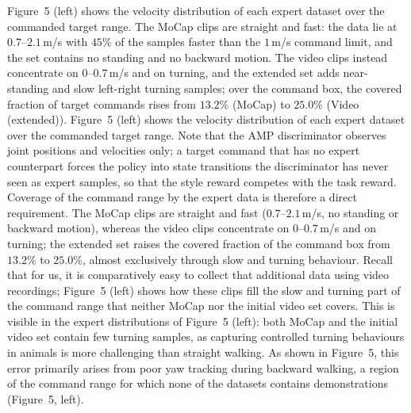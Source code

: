 Figure~5 (left) shows the velocity distribution of each expert dataset over the commanded target range. The MoCap clips are straight and fast: the data lie at $0.7$--$2.1\,$m/s with $45\%$ of the samples faster than the $1\,$m/s command limit, and the set contains no standing and no backward motion. The video clips instead concentrate on $0$--$0.7\,$m/s and on turning, and the extended set adds near-standing and slow left-right turning samples; over the command box, the covered fraction of target commands rises from $13.2\%$ (MoCap) to $25.0\%$ (Video (extended)).
Figure~5 (left) shows the velocity distribution of each expert dataset over the commanded target range. Note that the AMP discriminator observes joint positions and velocities only; a target command that has no expert counterpart forces the policy into state transitions the discriminator has never seen as expert samples, so that the style reward competes with the task reward. Coverage of the command range by the expert data is therefore a direct requirement. The MoCap clips are straight and fast ($0.7$--$2.1\,$m/s, no standing or backward motion), whereas the video clips concentrate on $0$--$0.7\,$m/s and on turning; the extended set raises the covered fraction of the command box from $13.2\%$ to $25.0\%$, almost exclusively through slow and turning behaviour.
Recall that for us, it is comparatively easy to collect that additional data using video recordings; Figure~5 (left) shows how these clips fill the slow and turning part of the command range that neither MoCap nor the initial video set covers.
This is visible in the expert distributions of Figure~5 (left): both MoCap and the initial video set contain few turning samples, as capturing controlled turning behaviours in animals is more challenging than straight walking.
As shown in Figure~5, this error primarily arises from poor yaw tracking during backward walking, a region of the command range for which none of the datasets contains demonstrations (Figure~5, left).


